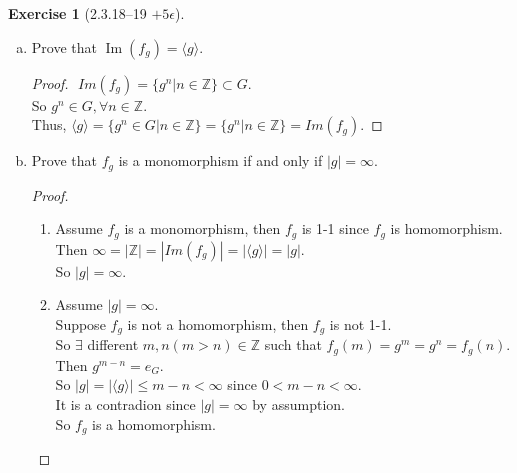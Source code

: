 \documentclass{amsart}
\newcommand{\bbz}{\mathbb{Z}}
\newcommand{\im}{\operatorname{Im}}
\theoremstyle{plain}
\theoremstyle{definition}
\newtheorem{exer}[lem]{Exercise}
\begin{document}
\begin{exer}[2.3.18--19 $+5\epsilon$]
\begin{enumerate}[(a)]
\item Prove that $\im(f_g)=\langle g\rangle$.
	\begin{proof}
		$ $\newline
		$Im(f_g) = \{g^n | n \in \bbz\} \subset G$.\\
		So $g^n \in G, \forall n \in \bbz$.\\
		Thus, $\langle g \rangle = \{g^n \in G | n \in \bbz\} = \{g^n | n \in \bbz\} = Im(f_g)$.
	\end{proof}
\item Prove that $f_g$ is a monomorphism if and only if $|g|=\infty$.
	\begin{proof}
		$ $\newline
		\begin{enumerate}
			\item
				Assume $f_g$ is a monomorphism, then $f_g$ is 1-1 since $f_g$ is homomorphism.\\
				Then $\infty= |\bbz| = |Im(f_g)| = |\langle g \rangle| = |g|$.\\
				So $|g| = \infty$.
			\item 
				Assume $|g| = \infty$.\\
				Suppose $f_g$ is not a homomorphism, then $f_g$ is not 1-1.\\
				So $\exists$ different $m,n (m>n) \in \bbz$ such that $f_g(m) = g^m = g^n= f_g(n)$.\\
				Then $g^{m-n} = e_G$.\\
				So $|g| = |\langle g \rangle| \leq m-n < \infty$ since $0< m-n < \infty$.\\
				It is a contradion since $|g| = \infty$ by assumption.\\
				So $f_g$ is a homomorphism.
		\end{enumerate}

	\end{proof}


\end{enumerate}
\end{exer}
\end{document}
